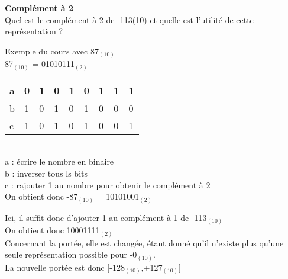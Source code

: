 \begin{Exercice}[15 minutes] \textbf{Complément à 2}\\
    Quel est le complément à 2 de -113(10) et quelle est l'utilité de cette représentation ? \\

    \begin{conseil}
    
    Exemple du cours avec 87$_{(10)}$ \\
    
    87$_{(10)}$ = 01010111$_{(2)}$ \\
    
         \begin{tabular}{| p{1cm} | p{1cm} | p{1cm} | p{1cm} | p{1cm} | p{1cm} | p{1cm} | p{1cm} | p{1cm} |} 
            \hline
            a & 0 & 1 & 0 & 1 & 0 & 1 & 1 & 1 \\ [0.5ex] 
            \hline
            b & 1 & 0 & 1 & 0 & 1 & 0 & 0 & 0 \\ [0.5ex]
            \hline
            c & 1 & 0 & 1 & 0 & 1 & 0 & 0 & 1 \\ [0.5ex]
            \hline
        \end{tabular} \\
        
        a : écrire le nombre en binaire \\
        
        b : inverser tous ls bits \\
        
        c : rajouter 1 au nombre pour obtenir le complément à 2 \\
        
        On obtient donc -87$_{(10)}$ = 10101001$_{(2)}$ \\
    \end{conseil}
    
    \begin{solution}
    	Ici, il suffit donc d'ajouter 1 au complément à 1 de -113$_{(10)}$ \\
    	
    	On obtient donc 10001111$_{(2)}$ \\
    	
    	Concernant la portée, elle est changée, étant donné qu'il n'existe plus qu'une seule représentation possible pour -0$_{(10)}$. \\
    	
    	La nouvelle portée est donc [-128$_{(10)}$,+127$_{(10)}$]
        
    \end{solution}
\end{Exercice}

